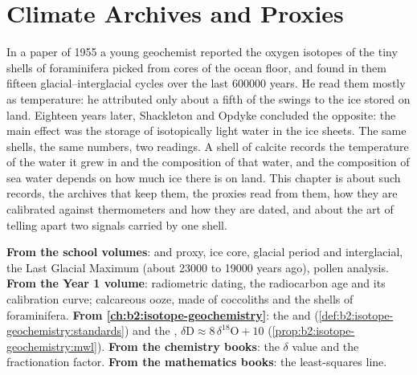 \chapter{Climate Archives and Proxies}\label{ch:b2:climate-proxies}

In a paper of 1955 a young geochemist reported the oxygen isotopes of the tiny shells of
foraminifera picked from cores of the ocean floor, and found in them fifteen glacial--interglacial cycles over the
last \num{600000} years. He read them mostly as temperature: he attributed only about a fifth of
the swings to the ice stored on land. Eighteen years later, Shackleton and Opdyke concluded the
opposite: the main effect was the storage of isotopically light water in the ice
sheets. The same shells, the same numbers, two readings. A shell of calcite records the
temperature of the water it grew in and the composition of that water, and the composition of
sea water depends on how much ice there is on land. This chapter is about such records, the
archives that keep them, the proxies read from them, how they are calibrated against thermometers
and how they are dated, and about the art of telling apart two signals carried by one shell.

\begin{recall}
\textbf{From the school volumes}:  and proxy, ice core, glacial period and
interglacial, the Last Glacial Maximum (about \num{23000} to \num{19000} years ago), pollen
analysis. \textbf{From the Year 1 volume}: radiometric dating, the radiocarbon age and its
calibration curve; calcareous ooze, made of coccoliths and the shells of foraminifera.
\textbf{From \cref{ch:b2:isotope-geochemistry}}: the   and 
(\cref{def:b2:isotope-geochemistry:standards}) and the , $\delta\mathrm{D}
\approx 8\,\delta^{18}\mathrm{O} + 10$ (\cref{prop:b2:isotope-geochemistry:mwl}). \textbf{From the
chemistry books}: the $\delta$ value and the fractionation factor. \textbf{From the mathematics
books}: the least-squares line.
\end{recall}

